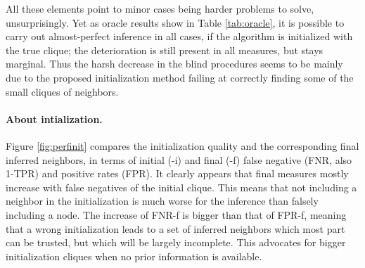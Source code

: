 All these elements point to minor cases being harder problems to solve, unsurprisingly. Yet as oracle results show in Table \ref{tab:oracle}, it is possible to carry out almost-perfect inference in all cases, if the algorithm is initialized with the true clique; the deterioration is still present in all measures, but stays marginal. Thus the harsh decrease in the blind procedures seems to be mainly due to the proposed initialization method failing at correctly finding some of the small cliques of neighbors.\\


\paragraph{About intialization.}
Figure \ref{fig:perfinit} compares the initialization quality and the corresponding final inferred neighbors, in terms of initial (-i) and final (-f) false negative (FNR, also 1-TPR) and positive rates (FPR). It clearly appears that final measures  mostly increase with false negatives of the initial clique. This means that not including a neighbor in the initialization is much worse for the inference than falsely including a node. The increase of FNR-f is bigger than that of FPR-f, meaning that a wrong initialization leads to a set of inferred neighbors which most part can be trusted, but which will be largely incomplete. This advocates for bigger initialization cliques when no prior information is available.


